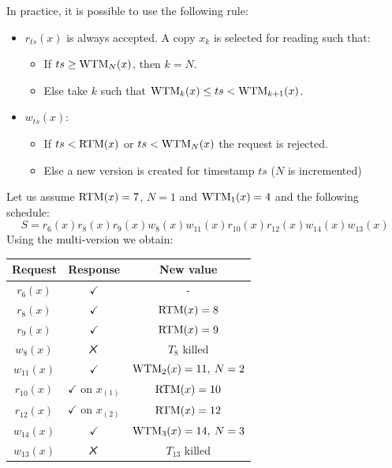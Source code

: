 \documentclass[12pt, a4paper]{report}
\newtheorem[style=M,bodystyle=\normalfont]{theorem}{Theorem}
\newtheorem[style=M,bodystyle=\normalfont]{corollary}{Corollary}
\newtheorem[style=M,bodystyle=\normalfont]{lemma}{Lemma}
\newtheorem[style=M,bodystyle=\normalfont]{definition}{Definition}
\newcommand{\tikzxmark}{%
\tikz[scale=0.23] {
    \draw[line width=0.7,line cap=round] (0,0) to [bend left=6] (1,1);
    \draw[line width=0.7,line cap=round] (0.2,0.95) to [bend right=3] (0.8,0.05);
}}
\begin{document}
    In practice, it is possible to use the following rule: 
    \begin{itemize}
        \item $r_{ts}(x)$ is always accepted. A copy $x_k$ is selected for reading such that:
            \begin{itemize}
                \item If $ts \geq \textnormal{WTM}_N(x)$, then $k=N$. 
                \item Else take $k$ such that $\textnormal{WTM}_k(x) \leq ts < \textnormal{WTM}_{k+1}(x)$. 
            \end{itemize}
        \item $w_{ts}(x)$:
            \begin{itemize}
                \item If $ts < \textnormal{RTM}(x)$ or $ts < \textnormal{WTM}_N(x)$ the request is rejected. 
                \item Else a new version is created for timestamp $ts$ ($N$ is incremented)
            \end{itemize}
    \end{itemize}
    \begin{example}
        Let us assume $\textnormal{RTM}(x)=7$, $N=1$ and $\textnormal{WTM}_1(x)=4$ and the following schedule: 
        \[S=r_6(x) r_8(x) r_9(x) w_8(x) w_{11}(x) r_{10}(x) r_{12}(x) w_{14}(x) w_{13}(x)\]
        Using the multi-version we obtain: 
        \begin{table}[H]
            \centering
            \begin{tabular}{ccc}
            \textbf{Request} & \textbf{Response}         & \textbf{New value}  \\ \hline
            $r_6(x)$         & $\checkmark$              & -                   \\
            $r_8(x)$         & $\checkmark$              & $\textnormal{RTM}(x)=8$          \\
            $r_9(x)$         & $\checkmark$              & $\textnormal{RTM}(x)=9$          \\
            $w_8(x)$         & $\tikzxmark$              & $T_8$ killed        \\
            $w_{11}(x)$      & $\checkmark$              & $\textnormal{WTM}_2(x)=11,\:N=2$ \\
            $r_{10}(x)$      & $\checkmark$ on $x_{(1)}$ & $\textnormal{RTM}(x)=10$         \\
            $r_{12}(x)$      & $\checkmark$ on $x_{(2)}$ & $\textnormal{RTM}(x)=12$         \\
            $w_{14}(x)$      & $\checkmark$              & $\textnormal{WTM}_3(x)=14,\:N=3$ \\
            $w_{13}(x)$      & $\tikzxmark$              & $T_{13}$ killed
            \end{tabular}
        \end{table}
    \end{example}
\end{document}

